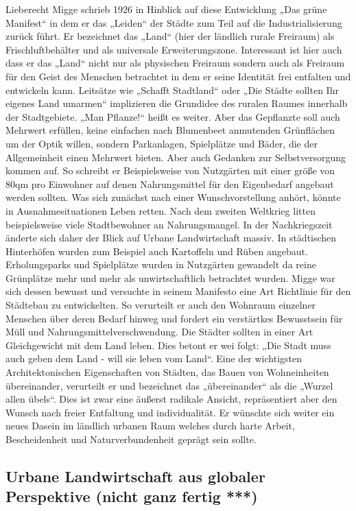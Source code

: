 \documentclass{scrartcl}
\begin{document}
Lieberecht Migge schrieb 1926 in Hinblick auf diese Entwicklung „Das grüne Manifest“ in dem er das „Leiden“ der Städte zum Teil auf die Industrialisierung zurück führt. Er bezeichnet das „Land“ (hier der ländlich rurale Freiraum) als Frischluftbehälter und als universale Erweiterungszone. Interessant ist hier auch dass er das „Land“ nicht nur als physischen Freiraum sondern auch als Freiraum für den Geist des Menschen betrachtet in dem er seine Identität frei entfalten und entwickeln kann. Leitsätze wie „Schafft Stadtland“ oder „Die Städte sollten Ihr eigenes Land umarmen“ implizieren die Grundidee des ruralen Raumes innerhalb der Stadtgebiete. „Man Pflanze!“ heißt es weiter. Aber das Gepflanzte soll auch Mehrwert erfüllen, keine einfachen nach Blumenbeet anmutenden Grünflächen um der Optik willen, sondern Parkanlagen, Spielplätze und Bäder, die der Allgemeinheit einen Mehrwert bieten. Aber auch Gedanken zur Selbstversorgung kommen auf. So schreibt er Beispielsweise von Nutzgärten mit einer größe von 80qm pro Einwohner auf denen Nahrungsmittel für den Eigenbedarf angebaut werden sollten. Was sich zunächst nach einer Wunschvorstellung anhört, könnte in Ausnahmesituationen Leben retten. Nach dem zweiten Weltkrieg litten beispielsweise viele Stadtbewohner an Nahrungsmangel. In der Nachkriegszeit änderte sich daher der Blick auf Urbane Landwirtschaft massiv. In städtischen Hinterhöfen wurden zum Beispiel auch Kartoffeln und Rüben angebaut. Erholungsparks und Spielplätze wurden in Nutzgärten gewandelt da reine Grünplätze mehr und mehr als unwirtschaftlich betrachtet wurden. Migge war sich dessen bewusst und versuchte in seinem Manifesto eine Art Richtlinie für den Städtebau zu entwickelten. So verurteilt er auch den Wohnraum einzelner Menschen über deren Bedarf hinweg und fordert ein verstärtkes Bewusstsein für Müll und Nahrungsmittelverschwendung. Die Städter sollten in einer Art Gleichgewicht mit dem Land leben. Dies betont er wei folgt: „Die Stadt muss auch geben dem Land - will sie leben vom Land“. Eine der wichtigsten Architektonischen Eigenschaften von Städten, das Bauen von Wohneinheiten übereinander, verurteilt er und bezeichnet das „übereinander“ als die „Wurzel allen übels“. Dies ist zwar eine äußerst radikale Ansicht, repräsentiert aber den Wunsch nach freier Entfaltung und individualität. Er wünschte sich weiter ein neues Dasein im ländlich urbanen Raum welches durch harte Arbeit, Bescheidenheit und Naturverbundenheit geprägt sein sollte.

\subsection{Urbane Landwirtschaft aus globaler Perspektive (nicht ganz fertig ***)}
\end{document}
